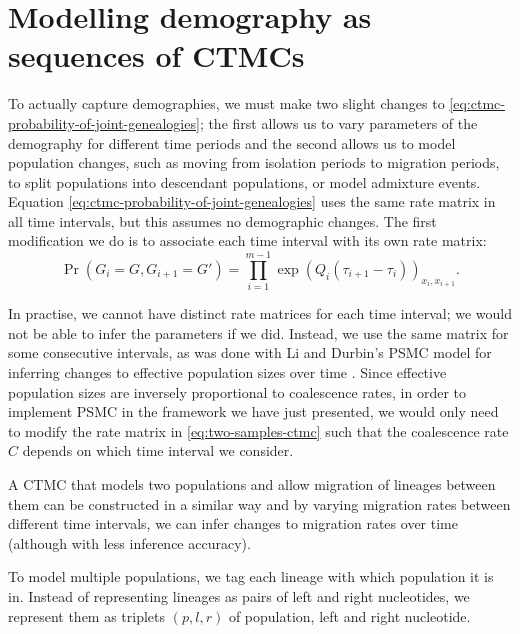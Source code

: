 \documentclass[graybox]{svmult}
\begin{document}
\section{Modelling demography as sequences of CTMCs}

To actually capture demographies, we must make two slight changes to \eqref{eq:ctmc-probability-of-joint-genealogies}; the first allows us to vary parameters of the demography for different time periods and the second allows us to model population changes, such as moving from isolation periods to migration periods, to split populations into descendant populations, or model admixture events. Equation \eqref{eq:ctmc-probability-of-joint-genealogies} uses the same rate matrix in all time intervals, but this assumes no demographic changes. The first modification we do is to associate each time interval with its own rate matrix:
\begin{equation}
	\Pr(G_i=G,G_{i+1}=G') =
	\prod_{i=1}^{m-1} \exp\left(Q_i\left(\tau_{i+1}-\tau_i\right)\right)_{x_i,x_{i+1}}
	.
\end{equation}

In practise, we cannot have distinct rate matrices for each time interval; we would not be able to infer the parameters if we did. Instead, we use the same matrix for some consecutive intervals, as was done with Li and Durbin's PSMC model for inferring changes to effective population sizes over time \cite{Li:2011eza}. Since effective population sizes are inversely proportional to coalescence rates, in order to implement PSMC in the framework we have just presented, we would only need to modify the rate matrix in \eqref{eq:two-samples-ctmc} such that the coalescence rate $C$ depends on which time interval we consider.

A CTMC that models two populations and allow migration of lineages between them can be constructed in a similar way \cite{Mailund:2012ewa} and by varying migration rates between different time intervals, we can infer changes to migration rates over time \cite{Cheng:2015kia} (although with less inference accuracy). 

To model multiple populations, we tag each lineage with which population it is in. Instead of representing lineages as pairs of left and right nucleotides, we represent them as triplets $(p,l,r)$ of population, left and right nucleotide.
\end{document}
